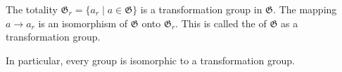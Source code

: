 The totality $\mathfrak{G}_r = \{a_r \mid a \in \mathfrak{G}\}$ is a transformation group in $\mathfrak{G}$. The mapping $a \to a_r$ is an isomorphism of $\mathfrak{G}$ onto $\mathfrak{G}_r$. This is called the  of $\mathfrak{G}$ as a transformation group.

In particular, every group is isomorphic to a transformation group.
